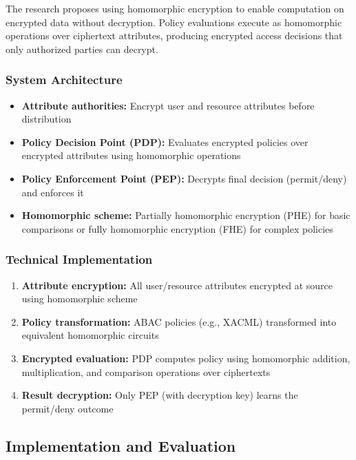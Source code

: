 The research proposes using homomorphic encryption to enable computation on encrypted data without decryption. Policy evaluations execute as homomorphic operations over ciphertext attributes, producing encrypted access decisions that only authorized parties can decrypt.

\subsubsection{System Architecture}

\begin{itemize}
    \item \textbf{Attribute authorities:} Encrypt user and resource attributes before distribution
    \item \textbf{Policy Decision Point (PDP):} Evaluates encrypted policies over encrypted attributes using homomorphic operations
    \item \textbf{Policy Enforcement Point (PEP):} Decrypts final decision (permit/deny) and enforces it
    \item \textbf{Homomorphic scheme:} Partially homomorphic encryption (PHE) for basic comparisons or fully homomorphic encryption (FHE) for complex policies
\end{itemize}

\subsubsection{Technical Implementation}

\begin{enumerate}
    \item \textbf{Attribute encryption:} All user/resource attributes encrypted at source using homomorphic scheme
    \item \textbf{Policy transformation:} ABAC policies (e.g., XACML) transformed into equivalent homomorphic circuits
    \item \textbf{Encrypted evaluation:} PDP computes policy using homomorphic addition, multiplication, and comparison operations over ciphertexts
    \item \textbf{Result decryption:} Only PEP (with decryption key) learns the permit/deny outcome
\end{enumerate}

\subsection{Implementation and Evaluation}

